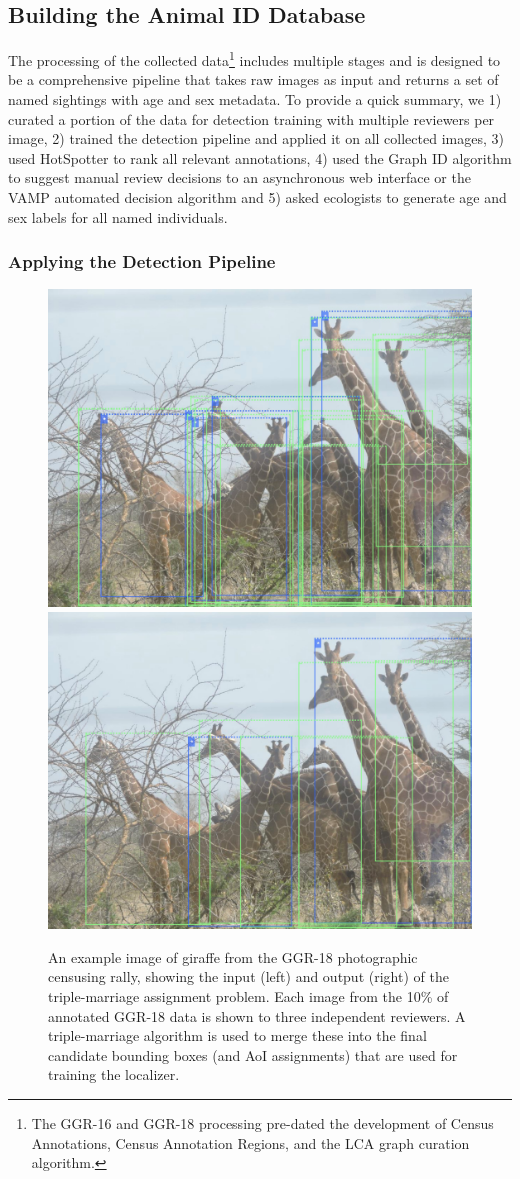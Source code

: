 \subsection{Building the Animal ID Database}

The processing of the collected data\footnote{The GGR-16 and GGR-18 processing pre-dated the development of Census Annotations, Census Annotation Regions, and the LCA graph curation algorithm.} includes multiple stages and is designed to be a comprehensive pipeline that takes raw images as input and returns a set of named sightings with age and sex metadata. To provide a quick summary, we 1) curated a portion of the data for detection training with multiple reviewers per image, 2) trained the detection pipeline and applied it on all collected images, 3) used HotSpotter to rank all relevant annotations, 4) used the Graph ID algorithm to suggest manual review decisions to an asynchronous web interface or the VAMP automated decision algorithm and 5) asked ecologists to generate age and sex labels for all named individuals.

\subsubsection{Applying the Detection Pipeline}

\begin{figure}[!t]
    \begin{center}
        \includegraphics[width=0.45\linewidth]{resources/detections-example-unmerged.pdf}
        \vspace{2mm}
        \includegraphics[width=0.45\linewidth]{resources/detections-example-merged.pdf}
    \end{center}
    \caption{An example image of giraffe from the GGR-18 photographic censusing rally, showing the input (left) and output (right) of the triple-marriage assignment problem.  Each image from the 10\% of annotated GGR-18 data is shown to three independent reviewers.  A triple-marriage algorithm is used to merge these into the final candidate bounding boxes (and AoI assignments) that are used for training the localizer.}
    \label{fig:marriage}
\end{figure}

